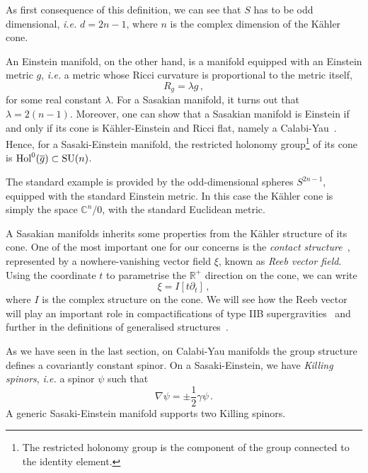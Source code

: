 \documentclass[debug]{phd}
\begin{document}
					As first consequence of this definition, we can see that $S$ has to be odd dimensional, \emph{i.e.} $d=2n-1$, where $n$ is the complex dimension of the K\"ahler cone.
					
					An Einstein manifold, on the other hand, is a manifold equipped with an Einstein metric $g$, \emph{i.e.} a metric whose Ricci curvature is proportional to the metric itself,
							\begin{equation*}
								R_g = \lambda g \, , 
							\end{equation*}
					for some real constant $\lambda$.
					For a Sasakian manifold, it turns out that $\lambda = 2(n-1)$. Moreover, one can show that a Sasakian manifold is Einstein if and only if its cone is K\"ahler-Einstein and Ricci flat, namely a Calabi-Yau~\cite{SparksSE}.
					Hence, for a Sasaki-Einstein manifold, the restricted holonomy group\footnote{%
						The restricted holonomy group is the component of the group connected to the identity element.%
						}
					of its cone is $\mathrm{Hol}^0 (\overline{g}) \subset \mathrm{SU}(n)$.
					
					The standard example is provided by the odd-dimensional spheres $S^{2n-1}$, equipped with the standard Einstein metric.
					In this case the K\"ahler cone is simply the space $\mathbb{C}^n / {0}$, with the standard Euclidean metric.
					
					A Sasakian manifolds inherits some properties from the K\"ahler structure of its cone.
					One of the most important one for our concerns is the \emph{contact structure}~\cite{contact1}, represented by a nowhere-vanishing vector field $\xi$, known as \emph{Reeb vector field}.
					Using the coordinate $t$ to parametrise the $\mathbb{R}^+$ direction on the cone, we can write
							\begin{equation}\label{Reeb1}
								\xi = I\left[ t \partial_t \right]\, ,
							\end{equation}
					where $I$ is the complex structure on the cone.
					We will see how the Reeb vector will play an important role in compactifications of type IIB supergravities~\cite{DavideSas1, DavideTriSas} and further in the definitions of generalised structures~\cite{AshmoreESE}.
					
					As we have seen in the last section, on Calabi-Yau manifolds the group structure defines a covariantly constant spinor.
					On a Sasaki-Einstein, we have \emph{Killing spinors}, \emph{i.e.} a spinor $\psi$ such that
							\begin{equation}
								\nabla \psi = \pm \frac{1}{2} \gamma \psi \, . 
							\end{equation}
%					 
			A generic Sasaki-Einstein manifold supports two Killing spinors.
\end{document}
